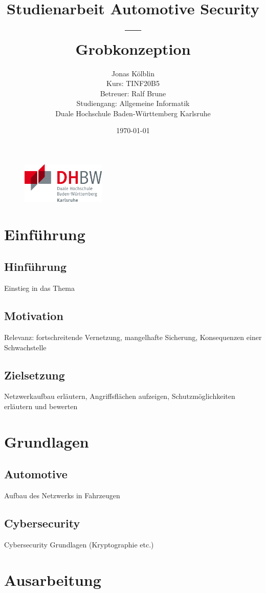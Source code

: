 \documentclass[
   ngerman          %
  ,a4paper          %
  ,12pt
  ,pdftex
]{article}
\title{Studienarbeit Automotive Security \\ --- \\ Grobkonzeption \vspace{4cm}}
\author{
        Jonas Kölblin \\
		Kurs: TINF20B5 \\
		Betreuer: Ralf Brune \\
		Studiengang: Allgemeine Informatik \\
        Duale Hochschule Baden-Württemberg Karlsruhe        
}
\date{\today}
\begin{document}
\begin{figure}[t]
\flushright
\includegraphics[width=4cm]{dhbw-logo}
\end{figure}

\maketitle


\newpage
\section{Einführung}
\subsection{Hinführung}
Einstieg in das Thema
\subsection{Motivation}
Relevanz: fortschreitende Vernetzung, mangelhafte Sicherung, Konsequenzen einer Schwachstelle
\subsection{Zielsetzung}
Netzwerkaufbau erläutern, Angriffsflächen aufzeigen, Schutzmöglichkeiten erläutern und bewerten

\section{Grundlagen}
\subsection{Automotive}
Aufbau des Netzwerks in Fahrzeugen
\subsection{Cybersecurity}
Cybersecurity Grundlagen (Kryptographie etc.)


\section{Ausarbeitung}
\end{document}
